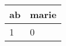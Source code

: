 \documentclass{article}[12pt]
\begin{document}
\centering
\begin{tabular}{ll}
ab&marie\\
\hline
1&0
\end{tabular}

  
\end{document}
